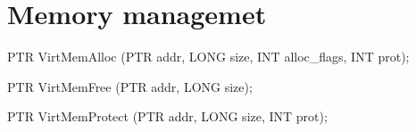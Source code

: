 \section{Memory managemet}
\label{sec:abi:memory}



\begin{paldef}
PTR VirtMemAlloc (PTR addr, LONG size,
                  INT alloc_flags, INT prot);
\end{paldef}


\begin{paldef}
PTR VirtMemFree (PTR addr, LONG size);
\end{paldef}


\begin{paldef}
PTR VirtMemProtect (PTR addr, LONG size, INT prot);
\end{paldef}


